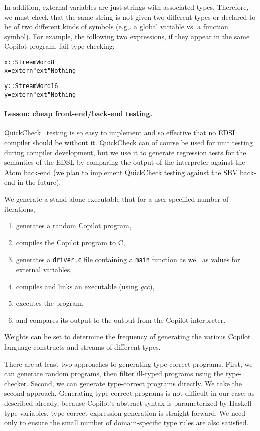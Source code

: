 \documentclass[9pt]{sigplanconf}
\newenvironment{code}{\begin{alltt}\footnotesize}{\end{alltt}}
\begin{document}
In addition, external variables are just strings with associated types.
Therefore, we must check that the same string is not given two different types
or declared to be of two different kinds of symbols (e.g,. a global variable
vs. a function symbol).  For example, the following two expressions, if they
appear in the same Copilot program, fail type-checking:
%
\begin{code}
x :: Stream Word8
x = extern "ext" Nothing

y :: Stream Word16
y = extern "ext" Nothing
\end{code}



\paragraph{Lesson: cheap front-end/back-end testing.}

QuickCheck~\cite{qc} testing is so easy to implement and so effective that no
EDSL compiler should be without it.  QuickCheck can of course be used for unit
testing during compiler development, but we use it to generate regression tests
for the semantics of the EDSL by comparing the output of the interpreter against
the Atom back-end (we plan to implement QuickCheck testing against the SBV
back-end in the future).

We generate a stand-alone executable that for a user-specified number of iterations,
\begin{enumerate}
\item generates a random Copilot program,
\item compiles the Copilot program to C,
\item generates a {\tt driver.c} file containing a {\tt main} function as well
  as values for external variables,
\item compiles and links an executable (using \emph{gcc}),
\item executes the program,
\item and compares its output to the output from the Copilot interpreter.
\end{enumerate}

\noindent
Weights can be set to determine the frequency of generating the various Copilot
language constructs and streams of different types.  

There are at least two approaches to generating type-correct programs.  First,
we can generate random programs, then filter ill-typed programs using the
type-checker.  Second, we can generate type-correct programs directly.  We take
the second approach.  Generating type-correct programs is not difficult in our
case: as described already, because Copilot's abstract syntax is parameterized
by Haskell type variables, type-correct expression generation is
straight-forward.  We need only to ensure the small number of domain-specific
type rules are also satisfied.
\end{document}
